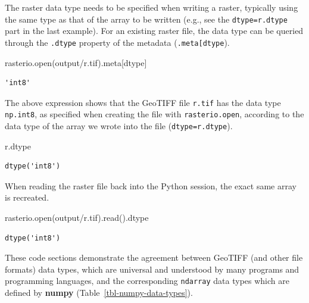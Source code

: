 \documentclass[
  letterpaper,
]{krantz}
\newenvironment{Shaded}{\begin{snugshade}}{\end{snugshade}}
\newcommand{\BuiltInTok}[1]{\textcolor[rgb]{0.00,0.23,0.31}{#1}}
\newcommand{\NormalTok}[1]{\textcolor[rgb]{0.00,0.23,0.31}{#1}}
\newcommand{\StringTok}[1]{\textcolor[rgb]{0.13,0.47,0.30}{#1}}
\begin{document}
The raster data type needs to be specified when writing a raster,
typically using the same type as that of the array to be written (e.g.,
see the \texttt{dtype=r.dtype} part in the last example). For an
existing raster file, the data type can be queried through the
\texttt{.dtype} property of the metadata
(\texttt{.meta{[}\textquotesingle{}dtype\textquotesingle{}{]}}).

\begin{Shaded}
\begin{Highlighting}[]
\NormalTok{rasterio.}\BuiltInTok{open}\NormalTok{(}\StringTok{\textquotesingle{}output/r.tif\textquotesingle{}}\NormalTok{).meta[}\StringTok{\textquotesingle{}dtype\textquotesingle{}}\NormalTok{]}
\end{Highlighting}
\end{Shaded}

\begin{verbatim}
'int8'
\end{verbatim}

The above expression shows that the GeoTIFF file \texttt{r.tif} has the
data type \texttt{np.int8}, as specified when creating the file with
\texttt{rasterio.open}, according to the data type of the array we wrote
into the file (\texttt{dtype=r.dtype}).

\begin{Shaded}
\begin{Highlighting}[]
\NormalTok{r.dtype}
\end{Highlighting}
\end{Shaded}

\begin{verbatim}
dtype('int8')
\end{verbatim}

When reading the raster file back into the Python session, the exact
same array is recreated.

\begin{Shaded}
\begin{Highlighting}[]
\NormalTok{rasterio.}\BuiltInTok{open}\NormalTok{(}\StringTok{\textquotesingle{}output/r.tif\textquotesingle{}}\NormalTok{).read().dtype}
\end{Highlighting}
\end{Shaded}

\begin{verbatim}
dtype('int8')
\end{verbatim}

These code sections demonstrate the agreement between GeoTIFF (and other
file formats) data types, which are universal and understood by many
programs and programming languages, and the corresponding
\texttt{ndarray} data types which are defined by \textbf{numpy}
(Table~\ref{tbl-numpy-data-types}).
\end{document}
